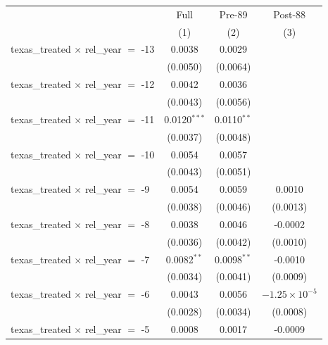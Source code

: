 
\begingroup
\centering
\begin{tabular}{lccc}
   \toprule
                                                & Full           & Pre-89         & Post-88 \\   
                                                & (1)            & (2)            & (3)\\  
   \midrule 
   texas\_treated $\times$ rel\_year $=$ -13    & 0.0038         & 0.0029         &   \\   
                                                & (0.0050)       & (0.0064)       &   \\   
   texas\_treated $\times$ rel\_year $=$ -12    & 0.0042         & 0.0036         &   \\   
                                                & (0.0043)       & (0.0056)       &   \\   
   texas\_treated $\times$ rel\_year $=$ -11    & 0.0120$^{***}$ & 0.0110$^{**}$  &   \\   
                                                & (0.0037)       & (0.0048)       &   \\   
   texas\_treated $\times$ rel\_year $=$ -10    & 0.0054         & 0.0057         &   \\   
                                                & (0.0043)       & (0.0051)       &   \\   
   texas\_treated $\times$ rel\_year $=$ -9     & 0.0054         & 0.0059         & 0.0010\\   
                                                & (0.0038)       & (0.0046)       & (0.0013)\\   
   texas\_treated $\times$ rel\_year $=$ -8     & 0.0038         & 0.0046         & -0.0002\\   
                                                & (0.0036)       & (0.0042)       & (0.0010)\\   
   texas\_treated $\times$ rel\_year $=$ -7     & 0.0082$^{**}$  & 0.0098$^{**}$  & -0.0010\\   
                                                & (0.0034)       & (0.0041)       & (0.0009)\\   
   texas\_treated $\times$ rel\_year $=$ -6     & 0.0043         & 0.0056         & $-1.25\times 10^{-5}$\\    
                                                & (0.0028)       & (0.0034)       & (0.0008)\\   
   texas\_treated $\times$ rel\_year $=$ -5     & 0.0008         & 0.0017         & -0.0009\\   

\end{tabular}
